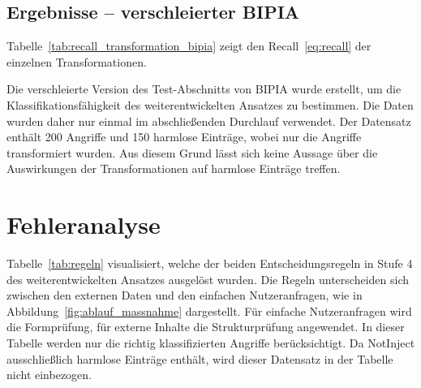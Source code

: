 \subsection{Ergebnisse -- verschleierter BIPIA}

Tabelle~\ref{tab:recall_transformation_bipia} zeigt den Recall~\eqref{eq:recall} der einzelnen Transformationen.

\begin{table}[htbp]
\centering
\caption{Recall je Transformation -- BIPIA, verschleiert}
\label{tab:recall_transformation_bipia}

\end{table}

Die verschleierte Version des Test-Abschnitts von BIPIA wurde erstellt, um die Klassifikationsfähigkeit des weiterentwickelten Ansatzes zu bestimmen. Die Daten
wurden daher nur einmal im abschließenden Durchlauf verwendet. Der Datensatz enthält 200 Angriffe und 150 harmlose Einträge, wobei nur die 
Angriffe transformiert wurden. Aus diesem Grund lässt sich keine Aussage über die Auswirkungen der Transformationen auf harmlose Einträge treffen.

\section{Fehleranalyse}\label{sec:fehleranalyse}

Tabelle~\ref{tab:regeln} visualisiert, welche der beiden Entscheidungsregeln in Stufe 4 des weiterentwickelten Ansatzes ausgelöst wurden. Die Regeln 
unterscheiden sich zwischen den externen Daten und den einfachen Nutzeranfragen, wie in Abbildung~\ref{fig:ablauf_massnahme} dargestellt. Für einfache Nutzeranfragen
wird die Formprüfung, für externe Inhalte die Strukturprüfung angewendet. In dieser Tabelle werden nur die richtig klassifizierten Angriffe berücksichtigt. Da NotInject
ausschließlich harmlose Einträge enthält, wird dieser Datensatz in der Tabelle nicht einbezogen. 

